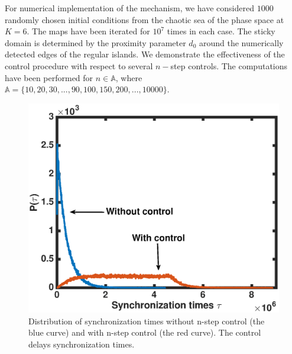 \documentclass[reprint,amsmath,amssymb,aps,pre]{revtex4-1}
\begin{document}
For numerical implementation of the mechanism, we have considered $1000$ 
randomly chosen initial conditions from the chaotic sea of the phase space at 
$K = 6$. The maps have been iterated for $10^7$ times in each case.  The 
sticky domain is determined by the proximity parameter $d_0$ around the 
numerically detected edges of the regular islands. We demonstrate the 
effectiveness of the control procedure  with respect to several $n-$step 
controls. The computations have been performed for $n \in \mathbb{A}$, where 
$\mathbb{A} = \{10, 20,30,...,90, 100, 150,200, ... ,10 000\}$.  

\begin{figure}[t]
	\includegraphics[scale=0.42]{Sync_time_dist.eps}
	\caption{\label{fig:Sync_time_dist}\footnotesize Distribution of 
		synchronization times without n-step control (the blue curve) and with 
		n-step 
		control (the red curve). The control delays synchronization times. }
\end{figure}
\end{document}
